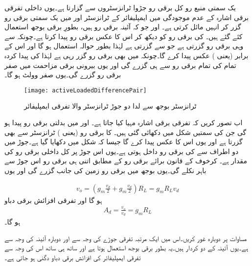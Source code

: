 یک سمتی  منبع رو کل  برقی رو جڑوا ٹرانزسٹروں سے گزارتا ہے۔یوں داخلی تفرقی برقی اشارہ کے عدم موجودگی میں ایمپلیفائر کے ٹرانزسٹر   اور  میں یک سمتی برقی رو  گزر کر انہیں مائل کرتی ہے۔  اور  جو کہ آئینہ برقی رو ہیں، بطورِ برقی بوجھ استعمال کئے گئے ہیں۔  کی برقی رو کو دیکھ کر  اس کا عکس برقی رو پیدا کرتا ہے۔چونکہ  سے وہی برقی رو گزرتی ہے جو  سے گزرتی ہے لہٰذا  بطور حوالہ استعمال ہو گا اور   اس کے برابر (یعنی   ) عکس پیدا کرے گا۔چونکہ   میں بھی  برقی رو گزر رہی ہے لہٰذا  کی پیدا کردہ تمام کی تمام برقی رو  سے ہی گزرے گی اور یوں بیرونی برقی مزاحمت  میں صفر برقی رو گزرے گی۔یوں  صفر وولٹ ہو گا۔
\begin{figure}
\centering
\texttt{[image: activeLoadedDifferencePair]}
\caption{ٹرانزسٹر بوجھ سے لدا دو جوڑ ٹرانزسٹر والا تفرقی ایمپلیفائر}
\label{شکل_ٹرانزسٹر_بار_سے_لدھا_تفرقی_جوڑا}
\end{figure}
اب تصور کریں کہ تفرقی برقی اشارہ  مہیا کیا جاتا ہے۔  اور   میں بدلتی برقی رو  پیدا ہو گی جن کی سمتیں شکل میں دکھائی گئی ہیں۔  کا برقی رو (یعنی  ) ٹرانزسٹر   سے بھی گزرتا ہے اور یوں   اس کا عکس پیدا کرے گا جیسا کہ شکل میں دکھایا گیا ہے۔جوڑ  میں دو اطراف سے   کی برقی رو داخل ہوتی ہے۔یوں اس جوڑ پر کل داخلی برقی رو کی مقدار   ہے۔ کرخوف کے قانون برائے برقی رو کے مطابق اتنی ہی برقی رو اس جوڑ سے باہر نکلے گی۔یوں بوجھ  میں  برقی رو زمین کی جانب گزرے گی اور یوں

\begin{align} \label{مساوات_تفرقی_ٹرانزسٹر_سے_لدھے_تفرقی_جوڑے_کا_مخارج}
v_o=\left(g_m \frac{v_d}{2}+g_m \frac{v_d}{2} \right )R_L=g_m R_L v_d
\end{align}
ہو گا اور تفرقی افزائش برقی دباو
\begin{align} \label{مساوات_تفرقی_ٹرانزسٹر_لدھا_تفرقی_افزائش}
A_d=\frac{v_o}{v_d}=g_m R_L
\end{align}
ہو گا۔

مساوات   پر دوبارہ غور کریں۔اس میں   ایک مرتبہ تفرقی جوڑے کی وجہ سے اور دوبارہ آئینہ کی وجہ سے ہے۔یوں آئینہ کے دو کردار ہیں۔یہ بطور برقی بوجھ استعمال ہوتا ہے اور ساتھ ہی ساتھ اس کی وجہ سے تفرقی ایمپلیفائر کی افزائش برقی دباو  دگنی ہو جاتی ہے۔

